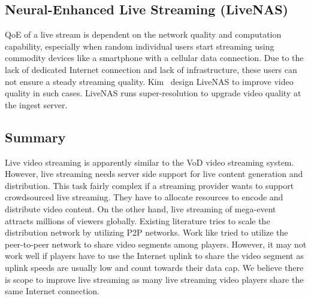 \subsection{Neural-Enhanced Live Streaming (LiveNAS)}
QoE of a live stream is dependent on the network quality and computation capability, especially when random individual users start streaming using commodity devices like a smartphone with a cellular data connection. Due to the lack of dedicated Internet connection and lack of infrastructure, these users can not ensure a steady streaming quality. Kim \etal\ design LiveNAS\cite{10.1145/3387514.3405856} to improve video quality in such cases. LiveNAS runs super-resolution to upgrade video quality at the ingest server.

\subsection{Summary}
Live video streaming is apparently similar to the VoD video streaming system. However, live streaming needs server side support for live content generation and distribution. This task fairly complex if a streaming provider wants to support crowdsourced live streaming. They have to allocate resources to encode and distribute video content. On the other hand, live streaming of mega-event attracts millions of viewers globally. Existing literature tries to scale the distribution network by utilizing P2P networks. Work like \cite{10.1145/2713168.2713182} tried to utilize the peer-to-peer network to share video segments among players. However, it may not work well if players have to use the Internet uplink to share the video segment as uplink speeds are usually low and count towards their data cap. We believe there is scope to improve live streaming as many live streaming video players share the same Internet connection.